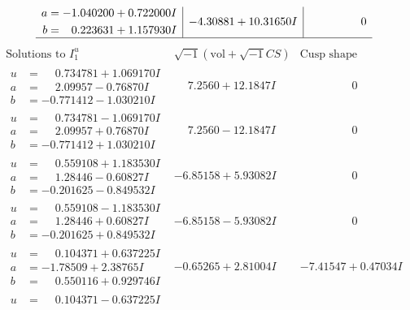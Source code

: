 \documentclass[1p]{elsarticle_modified}
\theoremstyle{definition}
\newcommand{\I}{\sqrt{-1}}
\begin{document}
$$\begin{array}{c|c|c}
\begin{aligned}
a &= -1.040200 + 0.722000 I \\
b &= \phantom{-}0.223631 + 1.157930 I\end{aligned}
 & -4.30881 + 10.31650 I & \phantom{-0.000000 } 0\\
 \hline 
 \end{array}$$\newpage$$\begin{array}{c|c|c}  
\text{Solutions to }I^u_{1}& \I (\text{vol} + \sqrt{-1}CS) & \text{Cusp shape}\\
 \hline 
\begin{aligned}
u &= \phantom{-}0.734781 + 1.069170 I \\
a &= \phantom{-}2.09957 - 0.76870 I \\
b &= -0.771412 - 1.030210 I\end{aligned}
 & \phantom{-}7.2560 + 12.1847 I & \phantom{-0.000000 } 0 \\ \hline\begin{aligned}
u &= \phantom{-}0.734781 - 1.069170 I \\
a &= \phantom{-}2.09957 + 0.76870 I \\
b &= -0.771412 + 1.030210 I\end{aligned}
 & \phantom{-}7.2560 - 12.1847 I & \phantom{-0.000000 } 0 \\ \hline\begin{aligned}
u &= \phantom{-}0.559108 + 1.183530 I \\
a &= \phantom{-}1.28446 - 0.60827 I \\
b &= -0.201625 - 0.849532 I\end{aligned}
 & -6.85158 + 5.93082 I & \phantom{-0.000000 } 0 \\ \hline\begin{aligned}
u &= \phantom{-}0.559108 - 1.183530 I \\
a &= \phantom{-}1.28446 + 0.60827 I \\
b &= -0.201625 + 0.849532 I\end{aligned}
 & -6.85158 - 5.93082 I & \phantom{-0.000000 } 0 \\ \hline\begin{aligned}
u &= \phantom{-}0.104371 + 0.637225 I \\
a &= -1.78509 + 2.38765 I \\
b &= \phantom{-}0.550116 + 0.929746 I\end{aligned}
 & -0.65265 + 2.81004 I & -7.41547 + 0.47034 I \\ \hline\begin{aligned}
u &= \phantom{-}0.104371 - 0.637225 I \\

\end{aligned}
\end{array}$$
\end{document}

